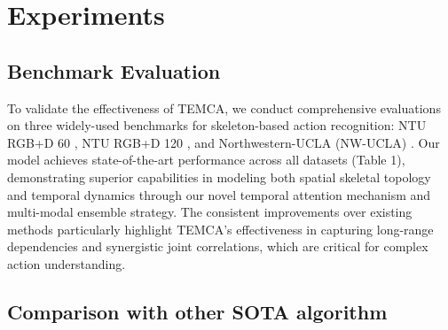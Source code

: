 \section{Experiments}

\subsection{Benchmark Evaluation}

To validate the effectiveness of TEMCA, we conduct comprehensive 
evaluations on three widely-used benchmarks for skeleton-based action 
recognition: NTU RGB+D 60 \cite{ntu}, NTU RGB+D 120 \cite{ntu120}, and 
Northwestern-UCLA (NW-UCLA) \cite{ref17}. Our model achieves 
state-of-the-art performance across all datasets (Table 1), 
demonstrating superior capabilities in modeling both spatial skeletal 
topology and temporal dynamics through our novel temporal attention 
mechanism and multi-modal ensemble strategy. The consistent improvements 
over existing methods particularly highlight TEMCA's effectiveness in 
capturing long-range dependencies and synergistic joint correlations, 
which are critical for complex action understanding.




\subsection{Comparison with other SOTA algorithm}

